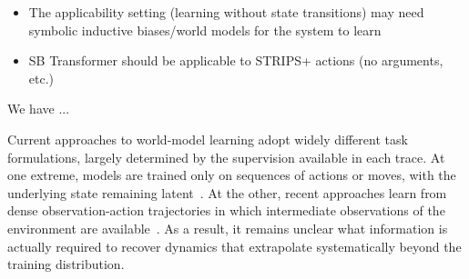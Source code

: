\begin{itemize}
    \item The applicability setting (learning without state transitions) may need symbolic inductive biases/world models for the system to learn
    \item SB Transformer should be applicable to STRIPS+ actions (no arguments, etc.)
\end{itemize}

We have ...

Current approaches to world-model learning adopt widely different task formulations, largely determined by the supervision available in each trace. At one extreme, models are trained only on sequences of actions or moves, with the underlying state remaining latent~\cite{Toshniwal_Wiseman_Livescu_Gimpel_2022,li_iclr,nanda2023linear}. At the other, recent approaches learn from dense observation-action trajectories in which intermediate observations of the environment are available~\cite{liang2025visualpredicator,liang2026exopredicator,athalye2026pixels}. As a result, it remains unclear what information is actually required to recover dynamics that extrapolate systematically beyond the training distribution.

